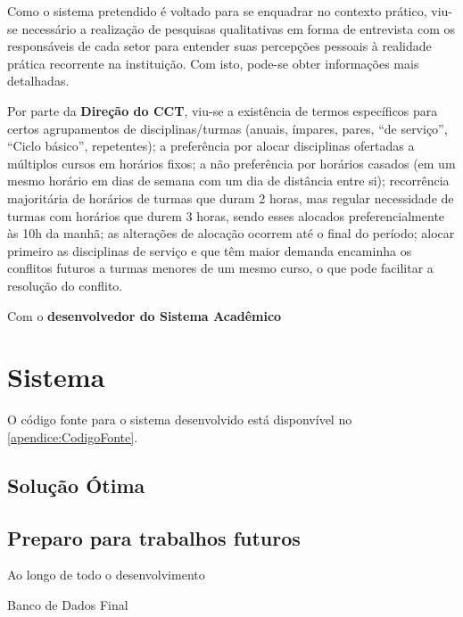 Como o sistema pretendido é voltado para se enquadrar no contexto prático, viu-se necessário a realização de pesquisas qualitativas em forma de entrevista com os responsáveis de cada setor para entender suas percepções pessoais à realidade prática recorrente na instituição. Com isto, pode-se obter informações mais detalhadas.

Por parte da \textbf{Direção do CCT}, viu-se a existência de termos específicos para certos agrupamentos de disciplinas/turmas (anuais, ímpares, pares, ``de serviço'', ``Ciclo básico'', repetentes); a preferência por alocar disciplinas ofertadas a múltiplos cursos em horários fixos; a não preferência por horários casados (em um mesmo horário em dias de semana com um dia de distância entre si); recorrência majoritária de horários de turmas que duram 2 horas, mas regular necessidade de turmas com horários que durem 3 horas, sendo esses alocados preferencialmente às 10h da manhã; as alterações de alocação ocorrem até o final do período; alocar primeiro as disciplinas de serviço e que têm maior demanda encaminha os conflitos futuros a turmas menores de um mesmo curso, o que pode facilitar a resolução do conflito.

Com o \textbf{desenvolvedor do Sistema Acadêmico}

\section{Sistema}

O código fonte para o sistema desenvolvido está disponvível no \autoref{apendice:CodigoFonte}.

\subsection{Solução Ótima} %

\subsection{Preparo para trabalhos futuros}

Ao longo de todo o desenvolvimento

\begin{MyCenteredFigure}
  \caption{Banco de Dados Final}
  \label{fig:BD_Final}
\end{MyCenteredFigure}


